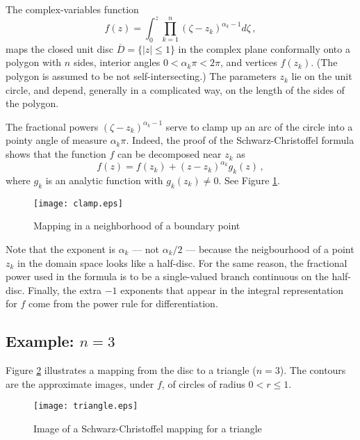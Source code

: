 \documentclass[12pt]{article}
\providecommand{\abs}[1]{\lvert#1\rvert}
\begin{document}



The complex-variables function
\[
f(z) = \int_0^z \prod_{k=1}^n (\zeta - z_k)^{\alpha_k-1} d\zeta\,,
\]
maps the closed unit disc $\overline{D} = \{ \abs{z} \leq 1\}$
in the complex plane conformally onto a polygon
with $n$ sides, interior angles $0 < \alpha_k \pi < 2\pi$,
and vertices $f(z_k)$.  (The polygon is assumed to be not self-intersecting.)
The parameters $z_k$ lie on the unit circle,
and depend, generally in a complicated way, on the length of the sides
of the polygon.

The fractional powers $(\zeta - z_k)^{\alpha_k - 1}$
serve to clamp up an arc of the 
circle into a pointy angle of measure $\alpha_k \pi$.  
Indeed, the proof of the Schwarz-Christoffel formula shows that the function $f$
can be decomposed near $z_k$ as
\[
f(z) = f(z_k) + (z-z_k)^{\alpha_k} g_k(z)\,,
\]
where $g_k$ is an analytic function with $g_k(z_k) \neq 0$.
See Figure \ref{fig:clamp}.

\begin{figure}
\begin{center}
\texttt{[image: clamp.eps]}
\end{center}
\caption{Mapping in a neighborhood of a boundary point}
\label{fig:clamp}
\end{figure}

Note that the exponent is $\alpha_k$ --- not $\alpha_k/2$ ---
because the neigbourhood of a point $z_k$ in the domain space
looks like a half-disc.
For the same reason, the fractional power used in the formula
is to be a single-valued branch continuous on the half-disc.
Finally, the extra $-1$ exponents that appear in the integral
 representation for $f$
come from the power rule for differentiation.

\subsection{Example: $n=3$}

Figure \ref{fig:triangle} illustrates a mapping
from the disc to a triangle ($n=3$).
The contours are the approximate images, under $f$, of circles
of radius $0 < r \leq 1$.

\begin{figure}[!htb]
\begin{center}
\texttt{[image: triangle.eps]}
\caption{Image of a Schwarz-Christoffel mapping for a triangle}
\end{center}
\label{fig:triangle}
\end{figure}
\end{document}
